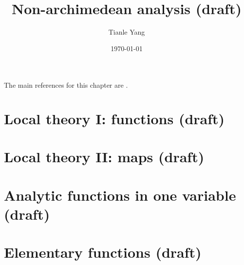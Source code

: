 \documentclass[sectionlevel=chapter]{noteformyself}
\title{Non-archimedean analysis (draft)}
\author{Tianle Yang}
\date{\today}
\begin{document}
    \maketitle

    \tableofcontents

    \vspace{1cm}

    The main references for this chapter are \cite{Gou97padic,Rob00padic,Li18aljabr1}.

    \section{Local theory I: functions (draft)}
    
    \section{Local theory II: maps (draft)}
    
    \section{Analytic functions in one variable (draft)}
    
    \section{Elementary functions (draft)}
    

    

    \printbibliography[heading=bibintoc, title={References}]
    
\end{document}
